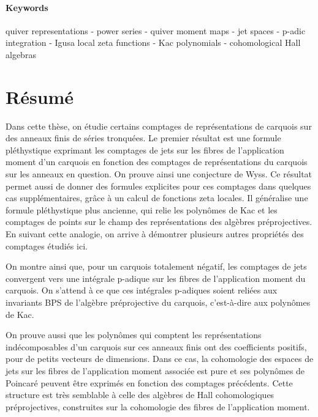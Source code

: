 \documentclass[11pt,english]{article}
\numberwithin{equation}{section}
\numberwithin{figure}{section}
\theoremstyle{definition}
\theoremstyle{plain}
\theoremstyle{remark}
\begin{document}
\paragraph*{Keywords}

quiver representations - power series - quiver moment maps - jet spaces
- p-adic integration - Igusa local zeta functions - Kac polynomials
- cohomological Hall algebras

\pagebreak{}

\section*{Résumé}


Dans cette thèse, on étudie certains comptages de représentations
de carquois sur des anneaux finis de séries tronquées. Le premier
résultat est une formule pléthystique exprimant les comptages de jets
sur les fibres de l'application moment d'un carquois en fonction des
comptages de représentations du carquois sur les anneaux en question.
On prouve ainsi une conjecture de Wyss. Ce résultat permet aussi de
donner des formules explicites pour ces comptages dans quelques cas
supplémentaires, grâce à un calcul de fonctions zeta locales. Il généralise
une formule pléthystique plus ancienne, qui relie les polynômes de
Kac et les comptages de points sur le champ des représentations des
algèbres préprojectives. En suivant cette analogie, on arrive à démontrer
plusieurs autres propriétés des comptages étudiés ici.

On montre ainsi que, pour un carquois totalement négatif, les comptages
de jets convergent vers une intégrale p-adique sur les fibres de l'application
moment du carquois. On s'attend à ce que ces intégrales p-adiques
soient reliées aux invariants BPS de l'algèbre préprojective du carquois,
c'est-à-dire aux polynômes de Kac.

On prouve aussi que les polynômes qui comptent les représentations
indécomposables d'un carquois sur ces anneaux finis ont des coefficients
positifs, pour de petits vecteurs de dimensions. Dans ce cas, la cohomologie
des espaces de jets sur les fibres de l'application moment associée
est pure et ses polynômes de Poincaré peuvent être exprimés en fonction
des comptages précédents. Cette structure est très semblable à celle
des algèbres de Hall cohomologiques préprojectives, construites sur
la cohomologie des fibres de l'application moment.
\end{document}
